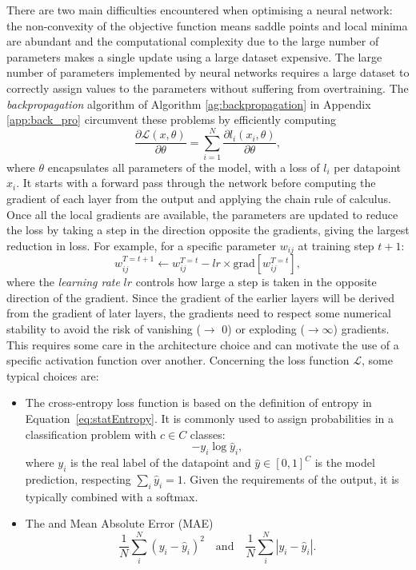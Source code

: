 There are two main difficulties encountered when optimising a neural network: the non-convexity of the objective function means saddle points and local minima are abundant and the computational complexity due to the large number of parameters makes a single update using a large dataset expensive. The large number of parameters implemented by neural networks requires a large dataset to correctly assign values to the parameters without suffering from overtraining. The \textit{backpropagation} algorithm of Algorithm \ref{ag:backpropagation} in Appendix \ref{app:back_pro} circumvent these problems \cite{backprop} by efficiently computing \[ \frac{\partial\mathcal{L}(x, \theta)}{\partial\theta} = \sum_{i=1}^N \frac{\partial l_i(x_i, \theta)}{\partial\theta},\] where $\theta$ encapsulates all parameters of the model, with a loss of $l_i$ per datapoint $x_i$. It starts with a forward pass through the network before computing the gradient of each layer from the output and applying the chain rule of calculus. Once all the local gradients are available, the parameters are updated to reduce the loss by taking a step in the direction opposite the gradients, giving the largest reduction in loss. For example, for a specific parameter $w_{ij}$ at training step $t+1$:
\begin{equation}\label{eq:gradientdescent}
    w^{T=t+1}_{ij} \leftarrow w^{T=t}_{ij} - lr \times \text{grad}\left[w^{T=t}_{ij}\right],
\end{equation}
where the \textit{learning rate} $lr$ controls how large a step is taken in the opposite direction of the gradient. Since the gradient of the earlier layers will be derived from the gradient of later layers, the gradients need to respect some numerical stability to avoid the risk of vanishing ($\rightarrow$ 0) or exploding ($\rightarrow \infty$) gradients. This requires some care in the architecture choice and can motivate the use of a specific activation function over another. Concerning the loss function $\mathcal{L}$, some typical choices are:
\begin{itemize}
    \item The cross-entropy loss function is based on the definition of entropy in Equation~\ref{eq:statEntropy}. It is commonly used to assign probabilities in a classification problem with $c \in C$ classes: \[ -y_i \log\hat{y}_i,\] where $y_i$ is the real label of the datapoint and $\hat{y} \in [0, 1]^C$ is the model prediction, respecting $\sum_i \hat{y}_i = 1$. Given the requirements of the output, it is typically combined with a softmax. 
    \item The  and Mean Absolute Error (MAE) \[\frac{1}{N}\sum_i^N (y_i - \hat{y}_i)^2 \quad \text{and} \quad \frac{1}{N}\sum_i^N |y_i - \hat{y}_i|.\] 
\end{itemize} 

